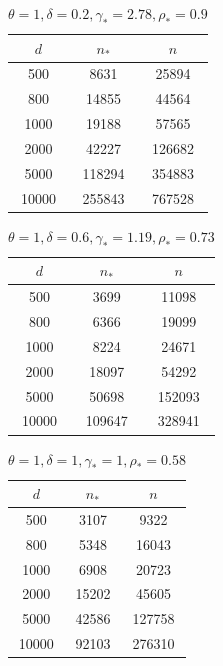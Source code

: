 \documentclass[12pt]{article}
\begin{document}
\begin{table}[p]
    \centering
    \begin{tabular}{|c|c|c|}
        \hline
        $d$ & $n_*$ & $n$ \\
        \hline
        500 & 8631 & 25894\\
        800 & 14855 & 44564\\
        1000 & 19188 & 57565 \\
        2000 & 42227 & 126682 \\
        5000 & 118294 & 354883 \\
        10000 & 255843 & 767528\\
        \hline
    \end{tabular}
    \caption{$\theta=1,\delta=0.2,\gamma_*=2.78,\rho_*=0.9$}
\end{table}

\begin{table}[p]
    \centering
    \begin{tabular}{|c|c|c|}
        \hline
        $d$ & $n_*$ & $n$ \\
        \hline
        500 & 3699 & 11098\\
        800 & 6366 & 19099\\
        1000 & 8224 & 24671 \\
        2000 & 18097 & 54292 \\
        5000 & 50698 & 152093 \\
        10000 & 109647 & 328941\\
        \hline
    \end{tabular}
    \caption{$\theta=1,\delta=0.6,\gamma_*=1.19,\rho_*=0.73$}
\end{table}

\begin{table}[p]
    \centering
    \begin{tabular}{|c|c|c|}
        \hline
        $d$ & $n_*$ & $n$ \\
        \hline
        500 & 3107 & 9322\\
        800 & 5348 & 16043\\
        1000 & 6908 & 20723 \\
        2000 & 15202 & 45605 \\
        5000 & 42586 & 127758 \\
        10000 & 92103 & 276310\\
        \hline
    \end{tabular}
    \caption{$\theta=1,\delta=1,\gamma_*=1,\rho_*=0.58$}
\end{table}
\end{document}

